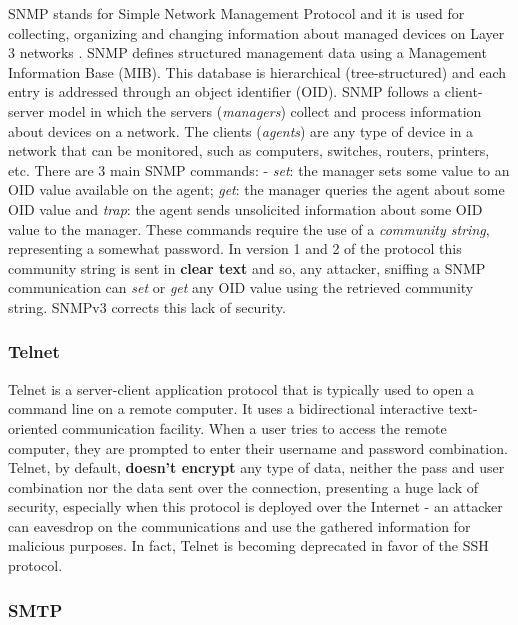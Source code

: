 SNMP stands for Simple Network Management Protocol and it is used for collecting, organizing and changing information about managed devices on Layer 3 networks
. SNMP defines structured management data using a Management Information Base (MIB). 
This database is hierarchical (tree-structured) and each entry is addressed through an object identifier (OID). 
SNMP follows a client-server model in which the servers (\textit{managers}) collect and process information about devices on a network. 
The clients (\textit{agents}) are any type of device in a network that can be monitored, such as computers, switches, routers, printers, etc. 
There are 3 main SNMP commands: - \textit{set}: the manager sets some value to an OID value available on the agent; \textit{get}: the manager queries the agent about some OID value and \textit{trap}: the agent sends unsolicited information about some OID value to the manager. 
These commands require the use of a \textit{community string}, representing a somewhat password. 
In version 1 and 2 of the protocol this community string is sent in \textbf{clear text} and so, any attacker, sniffing a SNMP communication can \textit{set} or \textit{get} any OID value using the retrieved community string. 
SNMPv3 corrects this lack of security. 

\subsubsection{Telnet}

Telnet is a server-client application protocol that is typically used to open a command line on a remote computer. 
It uses a bidirectional interactive text-oriented communication facility. 
When a user tries to access the remote computer, they are prompted to enter their username and password combination. 
Telnet, by default, \textbf{doesn't encrypt} any type of data, neither the pass and user combination nor the data sent over the connection, presenting a huge lack of security, especially when this protocol is deployed over the Internet - an attacker can  eavesdrop on the communications and use the gathered information for malicious purposes. 
In fact, Telnet is becoming deprecated in favor of the SSH protocol.


\subsubsection{SMTP}

